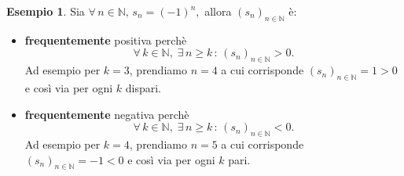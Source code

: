 \documentclass{article}
\theoremstyle{plain}
\theoremstyle{definition}
\newtheorem{exmp}{Esempio}[section]
\theoremstyle{remark}
\begin{document}
\vspace{10pt}

\begin{exmp}
    Sia \(\forall\, n\in\mathbb{N},\, s_n=(-1)^n,\) allora $(s_n)_{n\in\mathbb{N}}$ è:
    \begin{itemize}
        \item \textbf{frequentemente} positiva perchè 
        \[\forall\, k\in\mathbb{N},\;\exists\, n\geq k\,:\,(s_n)_{n\in\mathbb{N}}>0.\]
        Ad esempio per $k=3$, prendiamo $n=4$ a cui corrisponde $(s_n)_{n\in\mathbb{N}}=1>0$ e così via per ogni $k$ dispari.
        \item \textbf{frequentemente} negativa perchè 
        \[\forall\, k\in\mathbb{N},\;\exists\, n\geq k\,:\,(s_n)_{n\in\mathbb{N}}<0.\]
        Ad esempio per $k=4$, prendiamo $n=5$ a cui corrisponde $(s_n)_{n\in\mathbb{N}}=-1<0$ e così via per ogni $k$ pari.\\
    \end{itemize}

    \begin{center}
        \centering 
    \end{center}
\end{exmp}

\vspace{10pt}
\end{document}
